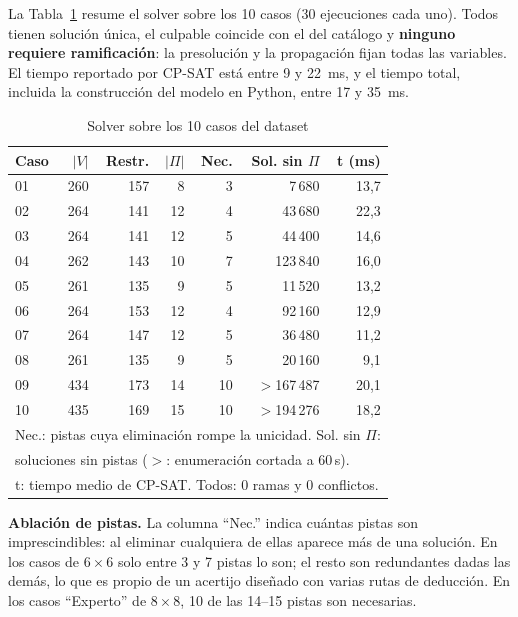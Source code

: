\documentclass[conference,a4paper]{IEEEtran}
\begin{document}
La Tabla~\ref{tab:casos} resume el solver sobre los 10 casos (30 ejecuciones cada uno).
Todos tienen solución única, el culpable coincide con el del catálogo y \textbf{ninguno
requiere ramificación}: la presolución y la propagación fijan todas las variables. El
tiempo reportado por CP-SAT está entre 9 y 22~ms, y el tiempo total, incluida la
construcción del modelo en Python, entre 17 y 35~ms.

\begin{table}[t]
\centering
\caption{Solver sobre los 10 casos del dataset}
\label{tab:casos}
\setlength{\tabcolsep}{3pt}
\begin{tabular}{lrrrrrr}
\toprule
\textbf{Caso} & $|V|$ & \textbf{Restr.} & $|\Pi|$ & \textbf{Nec.} & \textbf{Sol. sin $\Pi$} & \textbf{t (ms)}\\
\midrule
01 & 260 & 157 &  8 &  3 &   7\,680 & 13,7\\
02 & 264 & 141 & 12 &  4 &  43\,680 & 22,3\\
03 & 264 & 141 & 12 &  5 &  44\,400 & 14,6\\
04 & 262 & 143 & 10 &  7 & 123\,840 & 16,0\\
05 & 261 & 135 &  9 &  5 &  11\,520 & 13,2\\
06 & 264 & 153 & 12 &  4 &  92\,160 & 12,9\\
07 & 264 & 147 & 12 &  5 &  36\,480 & 11,2\\
08 & 261 & 135 &  9 &  5 &  20\,160 &  9,1\\
09 & 434 & 173 & 14 & 10 & $>$167\,487 & 20,1\\
10 & 435 & 169 & 15 & 10 & $>$194\,276 & 18,2\\
\bottomrule
\multicolumn{7}{l}{\footnotesize Nec.: pistas cuya eliminación rompe la unicidad. Sol. sin $\Pi$:}\\
\multicolumn{7}{l}{\footnotesize soluciones sin pistas ($>$: enumeración cortada a 60\,s).}\\
\multicolumn{7}{l}{\footnotesize t: tiempo medio de CP-SAT. Todos: 0 ramas y 0 conflictos.}
\end{tabular}
\end{table}

\textbf{Ablación de pistas.} La columna ``Nec.'' indica cuántas pistas son imprescindibles:
al eliminar cualquiera de ellas aparece más de una solución. En los casos de $6\times6$ solo
entre 3 y 7 pistas lo son; el resto son redundantes dadas las demás, lo que es propio de un
acertijo diseñado con varias rutas de deducción. En los casos ``Experto'' de $8\times8$, 10
de las 14--15 pistas son necesarias.
\end{document}
